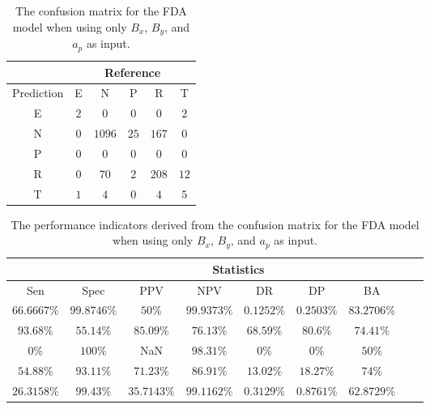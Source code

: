 \begin{table}[!ht]
	\centering
	\begin{tabular}{|c|c|c|c|c|c|}
		\hline
		 & \multicolumn{5}{|c|}{Reference} \\ \hline
		 Prediction & E & N & P & R & T \\ \hline
		 E & $2$ & $0$ & $0$ & $0$ & $2$ \\ \hline
		 N & $0$ & $1096$ & $25$ & $167$ & $0$ \\ \hline
		 P & $0$ & $0$ & $0$ & $0$ & $0$ \\ \hline
		 R & $0$ & $70$ & $2$ & $208$ & $12$ \\ \hline
		 T & $1$ & $4$ & $0$ & $4$ & $5$ \\ \hline
	\end{tabular}
	\caption{The confusion matrix for the FDA model when using only $B_{x}$, $B_{y}$, and $a_{p}$ as input.}
	\label{tab:cm:xyap:fda}
\end{table}

\begin{table}[!ht]
	\centering
	\begin{tabular}{|c|c|c|c|c|c|c|c|c|}
		\hline
		 & \multicolumn{7}{c|}{Statistics} \\ \hline
		Sen & Spec & PPV & NPV & DR & DP & BA \\ \hline
		$66.6667\%$ & $99.8746\%$ & $50\%$ & $99.9373\%$ & $0.1252\%$ & $0.2503\%$ & $83.2706\%$ \\ \hline
		$93.68\%$ & $55.14\%$ & $85.09\%$ & $76.13\%$ & $68.59\%$ & $80.6\%$ & $74.41\%$ \\ \hline
		$0\%$ & $100\%$ & NaN & $98.31\%$ & $0\%$ & $0\%$ & $50\%$ \\ \hline
		$54.88\%$ & $93.11\%$ & $71.23\%$ & $86.91\%$ & $13.02\%$ & $18.27\%$ & $74\%$ \\ \hline
		$26.3158\%$ & $99.43\%$ & $35.7143\%$ & $99.1162\%$ & $0.3129\%$ & $0.8761\%$ & $62.8729\%$ \\ \hline
	\end{tabular}
	\caption{The performance indicators derived from the confusion matrix for the FDA model when using only $B_{x}$, $B_{y}$, and $a_{p}$ as input.}
	\label{tab:cs:xyap:fda}
\end{table}

